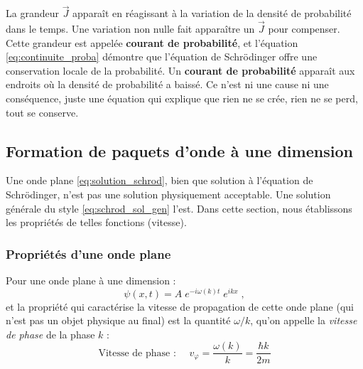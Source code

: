 \documentclass[12pt, a4paper]{book}
\begin{document}
La grandeur $\vec J$ apparaît en réagissant à la variation de la densité de probabilité dans le temps. Une variation non nulle fait apparaître un $\vec J$ pour compenser. Cette grandeur est appelée \textbf{courant de probabilité}, et l'équation \eqref{eq:continuite_proba} démontre que l'équation de Schrödinger offre une conservation locale de la probabilité. Un \textbf{courant de probabilité} apparaît aux endroits où la densité de probabilité a baissé. Ce n'est ni une cause ni une conséquence, juste une équation qui explique que rien ne se crée, rien ne se perd, tout se conserve.



\subsection{Formation de paquets d'onde à une dimension}
Une onde plane \eqref{eq:solution_schrod}, bien que solution à l'équation de Schrödinger, n'est pas une solution physiquement acceptable. Une solution générale du style \eqref{eq:schrod_sol_gen} l'est. Dans cette section, nous établissons les propriétés de telles fonctions (vitesse).
\subsubsection{Propriétés d'une onde plane}
Pour une onde plane à une dimension :
$$\psi(x,t) = A \; e^{-i\omega(k) t} \; e ^{ikx} \; ,$$
et la propriété qui caractérise la vitesse de propagation de cette onde plane (qui n'est pas un objet physique au final) est la quantité $\omega/k$, qu'on appelle la \textit{vitesse de phase} de la phase $k$ :
\begin{equation}
\text{Vitesse de phase : } \quad v_\varphi = \dfrac{\omega(k)}{k} = \dfrac{\hbar k}{2m}
\end{equation}
\end{document}
